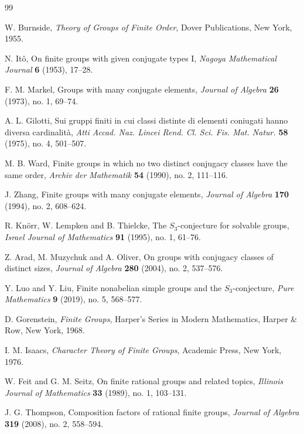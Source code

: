 \documentclass[11pt]{article}
\begin{document}
\begin{thebibliography}{99}

    W. Burnside,
    \textit{Theory of Groups of Finite Order},
    Dover Publications, New York, 1955.

    N. It\^o,
    On finite groups with given conjugate types I,
    \textit{Nagoya Mathematical Journal} \textbf{6} (1953), 17--28.

    F. M. Markel,
    Groups with many conjugate elements,
    \textit{Journal of Algebra} \textbf{26} (1973), no. 1, 69--74.

    A. L. Gilotti,
    Sui gruppi finiti in cui classi distinte di elementi coniugati hanno diversa cardinalit\`a,
    \textit{Atti Accad. Naz. Lincei Rend. Cl. Sci. Fis. Mat. Natur.} \textbf{58} (1975), no. 4, 501--507.

    M. B. Ward,
    Finite groups in which no two distinct conjugacy classes have the same order,
    \textit{Archiv der Mathematik} \textbf{54} (1990), no. 2, 111--116.

    J. Zhang,
    Finite groups with many conjugate elements,
    \textit{Journal of Algebra} \textbf{170} (1994), no. 2, 608--624.

    R. Kn\"orr, W. Lempken and B. Thielcke,
    The $S_3$-conjecture for solvable groups,
    \textit{Israel Journal of Mathematics} \textbf{91} (1995), no. 1, 61--76.

    Z. Arad, M. Muzychuk and A. Oliver,
    On groups with conjugacy classes of distinct sizes,
    \textit{Journal of Algebra} \textbf{280} (2004), no. 2, 537--576.

    Y. Luo and Y. Liu,
    Finite nonabelian simple groups and the $S_3$-conjecture,
    \textit{Pure Mathematics} \textbf{9} (2019), no. 5, 568--577.

    D. Gorenstein,
    \textit{Finite Groups},
    Harper's Series in Modern Mathematics, Harper \& Row, New York, 1968.

    I. M. Isaacs,
    \textit{Character Theory of Finite Groups},
    Academic Press, New York, 1976.

    W. Feit and G. M. Seitz,
    On finite rational groups and related topics,
    \textit{Illinois Journal of Mathematics} \textbf{33} (1989), no. 1, 103--131.

    J. G. Thompson,
    Composition factors of rational finite groups,
    \textit{Journal of Algebra} \textbf{319} (2008), no. 2, 558--594.


\end{thebibliography}
\end{document}
